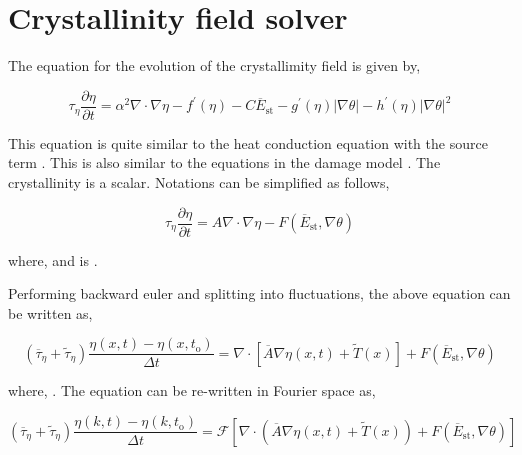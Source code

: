 \documentclass[a4paper,11pt,dvipsnames]{article}
\begin{document}
\section{Crystallinity field solver}
The equation for the evolution of the crystallimity field is given by,

\begin{equation}
	\tau_\eta \frac{\partial \eta}{\partial t} = \alpha^2 \nabla \cdot \nabla \eta - f^{'} (\eta) - C \overline{E}_{\text{st}} - g^{'} (\eta) | \nabla \theta | - h^{'} (\eta) | \nabla \theta |^2 \label{eq:21}
\end{equation}

This equation is quite similar to the heat conduction equation with the source term \cite{Shanthraj2019}. 
This is also similar to the equations in the damage model \cite{Shanthraj2019}. 
The crystallinity \mathsym{\eta} is a scalar. 
Notations can be simplified as follows, 

\begin{equation}
	\tau_{\eta} \frac{\partial \eta}{\partial t} = A \nabla \cdot \nabla \eta - F( \overline{E}_{\text{st}}, \nabla \theta ) \label{eq:22}
\end{equation}

where,  and  is . 

Performing backward euler and splitting into fluctuations, the above equation can be written as,

\begin{equation}
	(\overline{\tau}_{\eta} + \tilde{\tau}_{\eta}) \frac{ \eta(x,t) - \eta(x,t_{\text{o}})}{\Delta t} = \nabla \cdot \left [ \overline{A} \nabla \eta (x,t) + \tilde{T}(x) \right ] + F( \overline{E}_{\text{st}}, \nabla \theta ) \label{eq:23}
\end{equation}

where, . The equation can be re-written in Fourier space as, 

\begin{equation}
	(\overline{\tau}_{\eta} + \tilde{\tau}_{\eta}) \frac{ \eta(k,t) - \eta(k,t_{\text{o}})}{\Delta t} = \mathcal{F} \left [ \nabla \cdot \left ( \overline{A} \nabla \eta (x,t) + \tilde{T}(x) \right ) + F( \overline{E}_{\text{st}}, \nabla \theta ) \right ]  \label{eq:24}
\end{equation}
\end{document}
